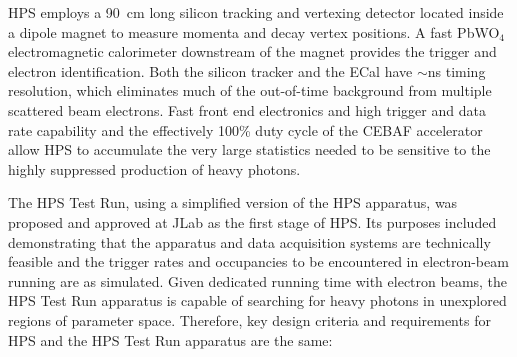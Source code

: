 \documentclass[final,3p,times,twocolumn]{elsarticle}
\begin{document}
HPS employs a 90~cm long silicon tracking and vertexing detector located inside a dipole magnet to measure 
momenta and decay vertex positions. A fast PbWO$_{4}$ electromagnetic calorimeter downstream of the 
magnet provides the trigger and electron identification. Both the silicon tracker and the ECal have $\sim$ns 
timing resolution, which eliminates much of the out-of-time background from multiple scattered beam electrons.  
Fast front end electronics and high trigger and data rate capability and the effectively 100\% duty cycle of the 
CEBAF accelerator allow HPS to accumulate the very large statistics needed to be sensitive to the highly 
suppressed production of heavy photons.

The HPS Test Run, using a simplified version of the HPS apparatus, was proposed and 
approved at JLab as the first stage of HPS. 
Its purposes included demonstrating that the apparatus and data acquisition systems are 
technically feasible and  the trigger rates and occupancies to be encountered in electron-beam 
running are as simulated. Given dedicated running time with electron beams, the HPS Test Run 
apparatus is capable of searching for heavy photons in unexplored regions of parameter space.    
Therefore, key design criteria and requirements for HPS and the HPS Test Run apparatus are the same:
\end{document}
